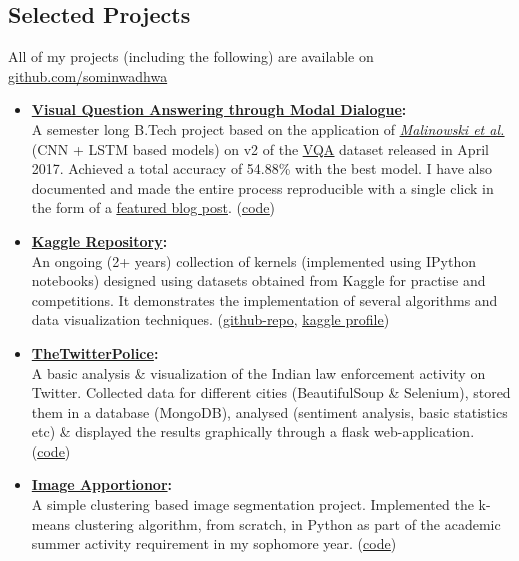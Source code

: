\documentclass[margin,line]{res}
\begin{document}
\begin{resume}
\section{\sc Selected Projects}
All of my projects (including the following) are available on {\href{https://github.com/sominwadhwa}{github.com/sominwadhwa}}\\
\begin{itemize}[leftmargin=*]
\item {\bf {\href{https://github.com/sominwadhwa/vqamd_floyd}{Visual Question Answering through Modal Dialogue}:}}\\
A semester long B.Tech project based on the application of \textit{\href{https://arxiv.org/pdf/1505.01121.pdf}{\underline{Malinowski et al.}}} (CNN + LSTM based models) on v2 of the {\href{http://visualqa.org/}{\underline{VQA}}} dataset released in April 2017. Achieved a total accuracy of 54.88\% with the best model. I have also documented and made the entire process reproducible with a single click in the form of a \href{https://blog.floydhub.com/asking-questions-to-images-with-deep-learning/}{\underline{featured blog post}}. ({\href{https://github.com/sominwadhwa/vqamd_floyd}{\underline{code}}})
\item {\bf {\href{https://github.com/sominwadhwa/Kaggle}{Kaggle Repository}:}}\\
An ongoing (2+ years) collection of kernels (implemented using IPython notebooks) designed using datasets obtained from Kaggle for practise and competitions. It demonstrates the implementation of several algorithms and data visualization techniques. ({\href{https://github.com/sominwadhwa/Kaggle}{\underline{github-repo}}}, {\href{https://www.kaggle.com/sominwadhwa}{\underline{kaggle profile}}})
\item {\bf {\href{https://github.com/sominwadhwa/TheTwitterPolice}{TheTwitterPolice}:}}\\
A basic analysis \& visualization of the Indian law enforcement activity on Twitter. Collected data for different cities (BeautifulSoup \& Selenium), stored them in a database (MongoDB), analysed (sentiment analysis, basic statistics etc) \& displayed the results graphically through a flask web-application. ({\href{https://github.com/sominwadhwa/TheTwitterPolice}{\underline{code}}})
\item {\bf {\href{https://github.com/sominwadhwa/Image-Apportionor}{Image Apportionor}:}}\\
A simple clustering based image segmentation project. Implemented the k-means clustering algorithm, from scratch, in Python as part of the academic summer activity requirement in my sophomore year. ({\href{https://github.com/sominwadhwa/TheTwitterPolice}{\underline{code}}})
\end{itemize}


\end{resume}
\end{document}
